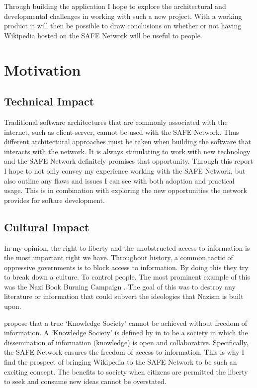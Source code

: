 Through building the application I hope to explore the architectural and developmental challenges in working with such a new project. With a working product it will then be possible to draw conclusions on whether or not having Wikipedia hosted on the SAFE Network will be useful to people.

\section{Motivation}

\subsection{Technical Impact}

Traditional software architectures that are commonly associated with the internet, such as client-server, cannot be used with the SAFE Network. Thus different architectural approaches must be taken when building the software that interacts with the network. It is always stimulating to work with new technology and the SAFE Network definitely promises that opportunity. Through this report I hope to not only convey my experience working with the SAFE Network, but also outline any flaws and issues I can see with both adoption and practical usage. This is in combination with exploring the new opportunities the network provides for softare development.

\subsection{Cultural Impact}

In my opinion, the right to liberty and the unobstructed access to information is the most important right we have. Throughout history, a common tactic of oppressive governments is to block access to information. By doing this they try to break down a culture. To control people. The most prominent example of this was the Nazi Book Burning Campaign \cite{book-burning}. The goal of this was to destroy any literature or information that could subvert the ideologies that Nazism is built upon.

\citeauthor{doi:10.1177/0165551506075327} propose that a true `Knowledge Society' cannot be achieved without freedom of information\cite{doi:10.1177/0165551506075327}. A `Knowledge Society' is defined by \citeauthor{binde2005towards} in \cite{binde2005towards} to be a society in which the dissemination of information (knowledge) is open and collaborative. Specifically, the SAFE Network ensures the freedom of access to information. This is why I find the prospect of bringing Wikipedia to the SAFE Network to be such an exciting concept. The benefits to society when citizens are permitted the liberty to seek and consume new ideas cannot be overstated.

